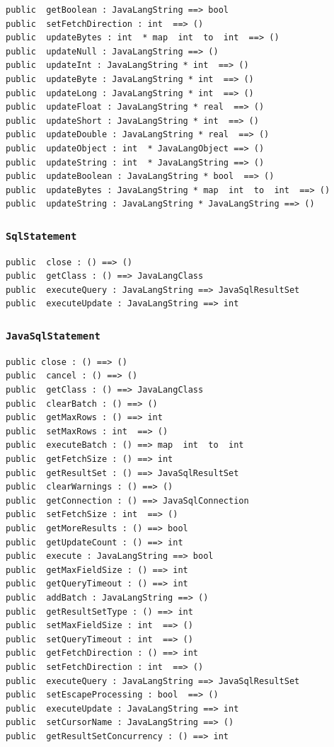 \documentclass[\pformat,12pt]{article}
\begin{document}
\begin{small}
\begin{verbatim}
public  getBoolean : JavaLangString ==> bool
public  setFetchDirection : int  ==> ()
public  updateBytes : int  * map  int  to  int  ==> ()
public  updateNull : JavaLangString ==> ()
public  updateInt : JavaLangString * int  ==> ()
public  updateByte : JavaLangString * int  ==> ()
public  updateLong : JavaLangString * int  ==> ()
public  updateFloat : JavaLangString * real  ==> ()
public  updateShort : JavaLangString * int  ==> ()
public  updateDouble : JavaLangString * real  ==> ()
public  updateObject : int  * JavaLangObject ==> ()
public  updateString : int  * JavaLangString ==> ()
public  updateBoolean : JavaLangString * bool  ==> ()
public  updateBytes : JavaLangString * map  int  to  int  ==> ()
public  updateString : JavaLangString * JavaLangString ==> ()
\end{verbatim}
\end{small}

\subsubsection{\texttt{SqlStatement}}
\begin{small}
\begin{verbatim}
public  close : () ==> ()
public  getClass : () ==> JavaLangClass
public  executeQuery : JavaLangString ==> JavaSqlResultSet
public  executeUpdate : JavaLangString ==> int
\end{verbatim}
\end{small}

\subsubsection{\texttt{JavaSqlStatement}}
\begin{small}
\begin{verbatim}
public close : () ==> ()
public  cancel : () ==> ()
public  getClass : () ==> JavaLangClass
public  clearBatch : () ==> ()
public  getMaxRows : () ==> int
public  setMaxRows : int  ==> ()
public  executeBatch : () ==> map  int  to  int
public  getFetchSize : () ==> int
public  getResultSet : () ==> JavaSqlResultSet
public  clearWarnings : () ==> ()
public  getConnection : () ==> JavaSqlConnection
public  setFetchSize : int  ==> ()
public  getMoreResults : () ==> bool
public  getUpdateCount : () ==> int
public  execute : JavaLangString ==> bool
public  getMaxFieldSize : () ==> int
public  getQueryTimeout : () ==> int
public  addBatch : JavaLangString ==> ()
public  getResultSetType : () ==> int
public  setMaxFieldSize : int  ==> ()
public  setQueryTimeout : int  ==> ()
public  getFetchDirection : () ==> int
public  setFetchDirection : int  ==> ()
public  executeQuery : JavaLangString ==> JavaSqlResultSet
public  setEscapeProcessing : bool  ==> ()
public  executeUpdate : JavaLangString ==> int
public  setCursorName : JavaLangString ==> ()
public  getResultSetConcurrency : () ==> int
\end{verbatim}
\end{small}

\appendix

\newpage



\newpage
{}
\printindex
\end{document}
